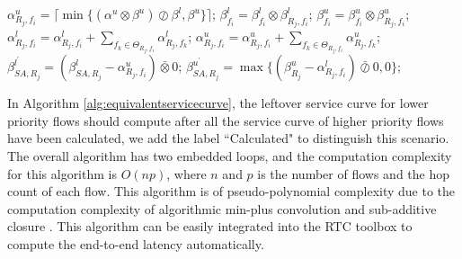 \documentclass[10pt,journal]{IEEEtran}
\begin{document}
\begin{algorithm}
\begin{algorithmic}[1]
            \STATE $\alpha^u_{R_j,f_i}=\lceil\min\{(\alpha^u\otimes\beta^u)\oslash\beta^l,\beta^u\}\rceil$;
            \STATE $\beta_{f_i}^l=\beta_{f_i}^l\otimes\beta_{R_j,f_i}^l$; $\beta_{f_i}^u=\beta_{f_i}^u\otimes\beta_{R_j,f_i}^u$;
                    \STATE $\alpha^l_{R_j,f_i}=\alpha^l_{R_j,f_i}+\sum_{f_k\in\Theta_{R_j,f_i}}\alpha^l_{R_j,f_k}$;
                    \STATE $\alpha^u_{R_j,f_i}=\alpha^u_{R_j,f_i}+\sum_{f_k\in\Theta_{R_j,f_i}}\alpha^u_{R_j,f_k}$;
                \ENDIF
                \STATE $\beta^{l^\prime}_{SA,R_j}=(\beta^l_{SA,R_j}-\alpha^u_{R_j,f_i})\bar{\otimes}0$;
                \STATE $\beta^{u^\prime}_{SA,R_j}=\max\{(\beta^u_{R_j}-\alpha^l_{R_j,f_i})\bar{\oslash}0,0\}$;
            \ENDIF
        \ENDFOR
    \ENDFOR
\end{algorithmic}
\end{algorithm}

In Algorithm \ref{alg:equivalentservicecurve}, the leftover service curve for lower priority flows should compute after all the service curve of higher priority flows have been calculated, we add the label ``Calculated" to distinguish this scenario. The overall algorithm has two embedded loops, and the computation complexity for this algorithm is $O(np)$, where $n$ and $p$ is the number of flows and the hop count of each flow. This algorithm is of pseudo-polynomial complexity due to the computation complexity of algorithmic min-plus convolution and sub-additive closure \cite{Bouillard2008}. This algorithm can be easily integrated into the RTC toolbox\cite{rtc} to compute the end-to-end latency automatically.
\end{document}
